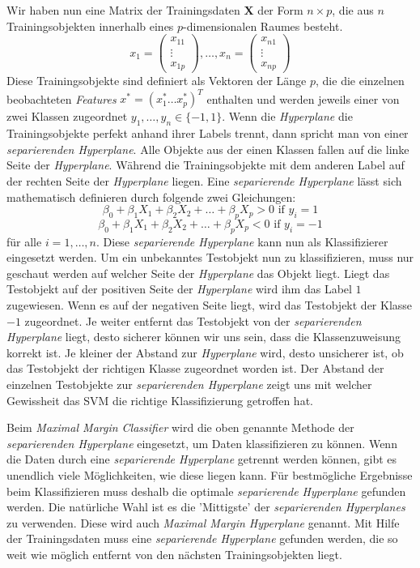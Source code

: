 Wir haben nun eine Matrix der Trainingsdaten $\mathbf{X}$ der Form $n \times p$, 
die aus $n$ Trainingsobjekten innerhalb eines $p$-dimensionalen Raumes besteht.
\[x_1 = \left(\begin{array}{c} x_{11} \\ \vdots \\ x_{1p} \end{array}\right) 
  , \dots, 
  x_n = \left(\begin{array}{c} x_{n1} \\ \vdots \\ x_{np} \end{array}\right) \]
Diese Trainingsobjekte sind definiert als Vektoren der Länge $p$, die die einzelnen beobachteten \textit{Features} 
$x^* = (x_1^* \dots x_p^*)^T$ enthalten und werden jeweils einer von zwei Klassen zugeordnet $y_1,\dots,y_n \in \{-1,1\}$.
Wenn die \textit{Hyperplane} die Trainingsobjekte perfekt anhand ihrer Labels trennt,
dann spricht man von einer \textit{separierenden Hyperplane}. 
Alle Objekte aus der einen Klassen fallen auf die linke Seite der \textit{Hyperplane}.
Während die Trainingsobjekte mit dem anderen Label auf der rechten Seite der \textit{Hyperplane} liegen.
Eine \textit{separierende Hyperplane} lässt sich mathematisch definieren durch folgende zwei Gleichungen:
\[\beta_0 + \beta_1X_1 + \beta_2X_2  + \dots + \beta_pX_p> 0 \text{ if } y_i = 1\]
\[\beta_0 + \beta_1X_1 + \beta_2X_2  + \dots + \beta_pX_p< 0 \text{ if } y_i = -1\]
für alle $i = 1 , \dots, n$.
Diese \textit{separierende Hyperplane} kann nun als Klassifizierer eingesetzt werden. 
Um ein unbekanntes Testobjekt nun zu klassifizieren, muss nur geschaut werden auf welcher Seite der \textit{Hyperplane} das Objekt liegt.
Liegt das Testobjekt auf der positiven Seite der \textit{Hyperplane} wird ihm das Label $1$ zugewiesen.
Wenn es auf der negativen Seite liegt, wird das Testobjekt der Klasse $-1$ zugeordnet.
Je weiter entfernt das Testobjekt von der \textit{separierenden Hyperplane} liegt, desto sicherer können wir uns sein,
dass die Klassenzuweisung korrekt ist. Je kleiner der Abstand zur \textit{Hyperplane} wird, desto unsicherer ist,
ob das Testobjekt der richtigen Klasse zugeordnet worden ist. 
Der Abstand der einzelnen Testobjekte zur \textit{separierenden Hyperplane} zeigt uns mit welcher Gewissheit das SVM
die richtige Klassifizierung getroffen hat.\cite[S. 339 - 141]{james_2013}

Beim \textit{Maximal Margin Classifier} wird die oben genannte Methode der \textit{separierenden Hyperplane} eingesetzt,
um Daten klassifizieren zu können. Wenn die Daten durch eine \textit{separierende Hyperplane} getrennt werden können,
gibt es unendlich viele Möglichkeiten, wie diese liegen kann. Für bestmögliche Ergebnisse beim Klassifizieren muss
deshalb die optimale \textit{separierende Hyperplane} gefunden werden. Die natürliche Wahl ist es die 'Mittigste' der
\textit{separierenden Hyperplanes} zu verwenden. Diese wird auch \textit{Maximal Margin Hyperplane} genannt.
Mit Hilfe der Trainingsdaten muss eine \textit{separierende Hyperplane} gefunden werden, die so weit wie möglich entfernt von den
nächsten Trainingsobjekten liegt.\cite[S. 1565f.]{noble_2006}

